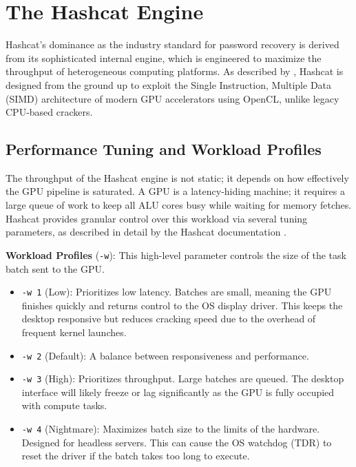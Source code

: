 \section{The Hashcat Engine}

Hashcat's dominance as the industry standard for password recovery is derived from its sophisticated internal engine, which is engineered to maximize the throughput of heterogeneous computing platforms. As described by \cite{bitwarden_hashcat}, Hashcat is designed from the ground up to exploit the Single Instruction, Multiple Data (SIMD) architecture of modern GPU accelerators using OpenCL, unlike legacy CPU-based crackers.

\subsection{Performance Tuning and Workload Profiles}

The throughput of the Hashcat engine is not static; it depends on how effectively the GPU pipeline is saturated. A GPU is a latency-hiding machine; it requires a large queue of work to keep all ALU cores busy while waiting for memory fetches. Hashcat provides granular control over this workload via several tuning parameters, as described in detail by the Hashcat documentation \cite{workload_profiles}.

\textbf{Workload Profiles} (\verb|-w|): This high-level parameter controls the size of the task batch sent to the GPU.

\begin{itemize}
    \item \verb|-w 1| (Low): Prioritizes low latency. Batches are small, meaning the GPU finishes quickly and returns control to the OS display driver. This keeps the desktop responsive but reduces cracking speed due to the overhead of frequent kernel launches.

    \item \verb|-w 2| (Default): A balance between responsiveness and performance.

    \item \verb|-w 3| (High): Prioritizes throughput. Large batches are queued. The desktop interface will likely freeze or lag significantly as the GPU is fully occupied with compute tasks.

    \item \verb|-w 4| (Nightmare): Maximizes batch size to the limits of the hardware. Designed for headless servers. This can cause the OS watchdog (TDR) to reset the driver if the batch takes too long to execute.
\end{itemize}

